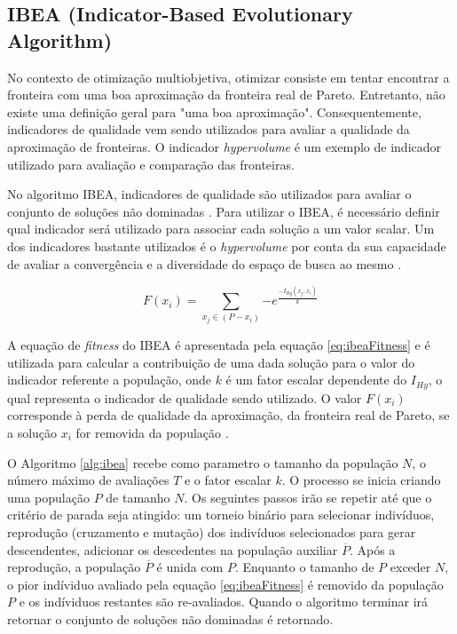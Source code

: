 
\subsection{IBEA (Indicator-Based Evolutionary Algorithm)}

No contexto de otimização multiobjetiva, otimizar consiste em tentar encontrar a fronteira com uma boa aproximação da fronteira real de Pareto. 
Entretanto, não existe uma definição geral para "uma boa aproximação". Consequentemente, indicadores de qualidade vem sendo utilizados
para avaliar a qualidade da aproximação de fronteiras. O indicador \textit{hypervolume} é um exemplo de indicador utilizado para avaliação e comparação 
das fronteiras.

No algoritmo IBEA, indicadores de qualidade são	utilizados para avaliar o conjunto de soluções não dominadas \cite{figueiredo2013algoritmo}.
Para utilizar o IBEA, é necessário definir qual indicador será utilizado para associar cada solução a um valor scalar. Um dos indicadores bastante utilizados é o \textit{hypervolume} por conta da sua capacidade de avaliar a convergência e a diversidade do espaço de busca ao mesmo \cite{ishibuchi2008evolutionary}.

\begin{equation} \label{eq:ibeaFitness}
F(x_i) = \sum_{x_j \in (P-x_i)} {-e^\frac{-I_{Hy}(x_j,x_i)}{k}}
\end{equation}

A equação de \textit{fitness} do IBEA é apresentada pela equação \ref{eq:ibeaFitness} e é utilizada para calcular a contribuição de uma dada solução
para o valor do indicador referente a população, onde $k$ é um fator escalar dependente do $I_{Hy}$, o qual representa o indicador de qualidade sendo utilizado. O valor $F(x_i)$ corresponde à perda de qualidade da aproximação, da fronteira real de Pareto, se a solução $x_i$ for removida da população \cite{figueiredo2013algoritmo}.


O Algoritmo \ref{alg:ibea} recebe como parametro o tamanho da população $N$, o número máximo de avaliações $T$ e o fator escalar $k$. O processo se inicia
criando uma população $P$ de tamanho $N$. Os seguintes passos irão se repetir até que o critério de parada seja atingido: um torneio binário 
para selecionar indivíduos, reprodução (cruzamento e mutação) dos indivíduos selecionados para gerar descendentes, adicionar os descedentes na população
auxiliar $\overline P$. Após a reprodução, a população $\overline P$ é unida com $P$. Enquanto o tamanho de $P$ exceder $N$, o pior indíviduo avaliado
pela equação \ref{eq:ibeaFitness} é removido da população $P$ e os indíviduos restantes são re-avaliados. Quando o algoritmo terminar irá retornar o conjunto
de soluções não dominadas é retornado.

